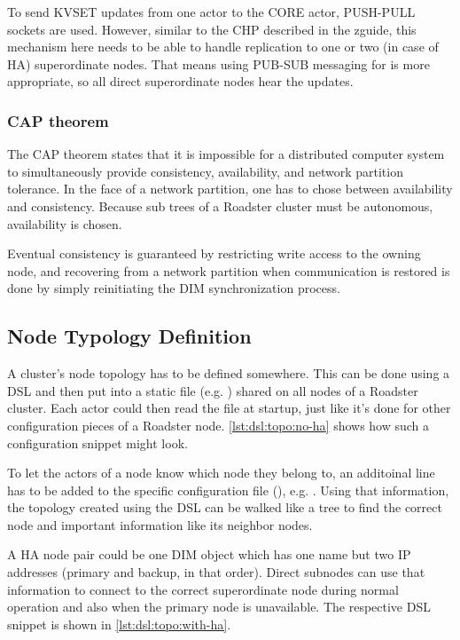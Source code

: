 To send KVSET updates from one actor to the CORE actor, PUSH-PULL sockets are
used. However, similar to the \gls{CHP} described in the \gls{zguide}, this
mechanism here needs to be able to handle replication to one or two (in case of
HA) superordinate nodes. That means using PUB-SUB messaging for is more
appropriate, so all direct superordinate nodes hear the updates.

\subsubsection{CAP theorem}
The CAP theorem \cite{wp:cap} states that it is impossible for a distributed
computer system to simultaneously provide consistency, availability, and
network partition tolerance. In the face of a network partition, one has to
chose between availability and consistency. Because sub trees of a Roadster
cluster must be autonomous, availability is chosen.

Eventual consistency is guaranteed by restricting write access to the owning
node, and recovering from a network partition when communication is restored is
done by simply reinitiating the DIM synchronization process.

\subsection{Node Typology Definition}
A cluster's node topology has to be defined somewhere. This can be done using a
\gls{DSL} and then put into a static file (e.g. ) shared
on all nodes of a Roadster cluster. Each actor could then read the file at
startup, just like it's done for other configuration pieces of a Roadster node.
\autoref{lst:dsl:topo:no-ha} shows how such a configuration snippet might look.

To let the actors of a node know which node they belong to, an additoinal line
has to be added to the specific configuration file (), e.g.
. Using that information, the topology
created using the DSL can be walked like a tree to find the correct node and
important information like its neighbor nodes.

A HA node pair could be one DIM object which has one name but two IP addresses
(primary and backup, in that order). Direct subnodes can use that information
to connect to the correct superordinate node during normal operation and also
when the primary node is unavailable. The respective DSL snippet is shown in
\autoref{lst:dsl:topo:with-ha}.

